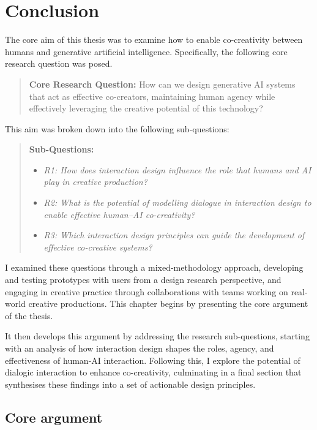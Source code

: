 \chapter[Conclusion]{Conclusion}\label{c:conclusion}

The core aim of this thesis was to examine how to enable co-creativity between humans and generative artificial intelligence. Specifically, the following core research question was posed.

\begin{quote}
\textbf{Core Research Question:} How can we design generative AI systems that
act as effective co-creators, maintaining human agency while effectively leveraging the creative potential of this technology?  
\end{quote}



This aim was broken down into the following sub-questions:

\begin{quote}
\textbf{Sub-Questions:}
\begin{itemize}
    \item \emph{R1: How does interaction design influence the role that humans and AI play in creative production?}
    \item \emph{R2: What is the potential of modelling dialogue in interaction design to enable effective human–AI co-creativity?}
    \item \emph{R3: Which interaction design principles can guide the development of effective co-creative systems?}
\end{itemize}
\end{quote}

I examined these questions through a mixed-methodology approach, developing and testing prototypes with users from a design research perspective, and engaging in creative practice through collaborations with teams working on real-world creative productions. This chapter begins by presenting the core argument of the thesis. 

It then develops this argument by addressing the research sub-questions, starting with an analysis of how interaction design shapes the roles, agency, and effectiveness of human-AI interaction. Following this, I explore the potential of dialogic interaction to enhance co-creativity, culminating in a final section that synthesises these findings into a set of actionable design principles.

\section{Core argument}

